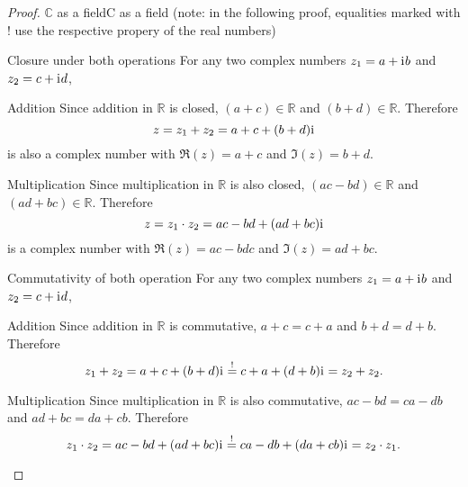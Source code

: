 \begin{proof}{$\bm{\mathbb{C}}$ as a field}{C as a field}
	(note: in the following proof, equalities marked with $!$ use the respective propery of the real numbers)

	\begin{descitemize}
		\item[Closure under both operations] For any two complex numbers $z_{1}=a+\mathrm{i}\mkern1mu b$ and $z_{2}=c+\mathrm{i}\mkern1mu d$,
			\begin{listitemize}
			\item[Addition] Since addition in $\mathbb{R}$ is closed, $(a+c)\in\mathbb{R}$ and $(b+d)\in\mathbb{R}$. Therefore
				\[
					z = z_{1}+z_{2} = a+c + (b+d)\mathrm{i}\mkern1mu
				\]
				is also a complex number with $\Re(z)=a+c$ and $\Im(z)=b+d$.
			\item[Multiplication] Since multiplication in $\mathbb{R}$ is also closed, $(ac-bd)\in\mathbb{R}$ and $(ad+bc)\in\mathbb{R}$. Therefore
				\[
					z = z_{1} \cdot z_{2} = ac-bd + (ad+bc)\mathrm{i}\mkern1mu
				\]
				is a complex number with $\Re(z)=ac-bdc$ and $\Im(z)=ad+bc$.
			\end{listitemize}
		
		\item[Commutativity of both operation] For any two complex numbers $z_{1}=a+\mathrm{i}\mkern1mu b$ and $z_{2}=c+\mathrm{i}\mkern1mu d$,
			\begin{listitemize}
			\item[Addition] Since addition in $\mathbb{R}$ is commutative, $a+c=c+a$ and $b+d=d+b$. Therefore
				\[
					z_{1} + z_{2} = a+c + (b+d)\mathrm{i}\mkern1mu \overset{!}{=} c+a + (d+b)\mathrm{i}\mkern1mu = z_{2}+z_{2}.
				\]
			\item[Multiplication] Since multiplication in $\mathbb{R}$ is also commutative, $ac-bd = ca-db$ and $ad+bc=da+cb$. Therefore
				\[
					z_{1} \cdot z_{2} = ac-bd + (ad+bc)\mathrm{i}\mkern1mu \overset{!}{=} ca-db + (da+cb)\mathrm{i}\mkern1mu = z_{2} \cdot z_{1}.
				\]
			\end{listitemize}
		

\end{descitemize}
\end{proof}
